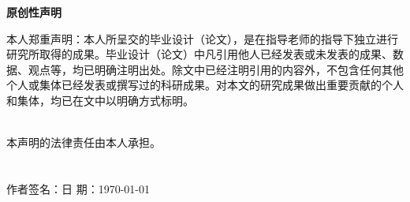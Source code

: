 
{\hfill \erhao{}\textbf {原创性声明} \hfill}
\label{original}
\thispagestyle{headFancy}
\vspace*{18pt}
\linespread{1.25}
\song\xiaosan

本人郑重声明：本人所呈交的毕业设计（论文），是在指导老师的指导下独立进行研究所取得的成果。毕业设计（论文）中凡引用他人已经发表或未发表的成果、数据、观点等，均已明确注明出处。除文中已经注明引用的内容外，不包含任何其他个人或集体已经发表或撰写过的科研成果。对本文的研究成果做出重要贡献的个人和集体，均已在文中以明确方式标明。

~\\
\noindent 本声明的法律责任由本人承担。\\
~\\
~\\
作者签名：\hspace{5cm}日  期：\today
